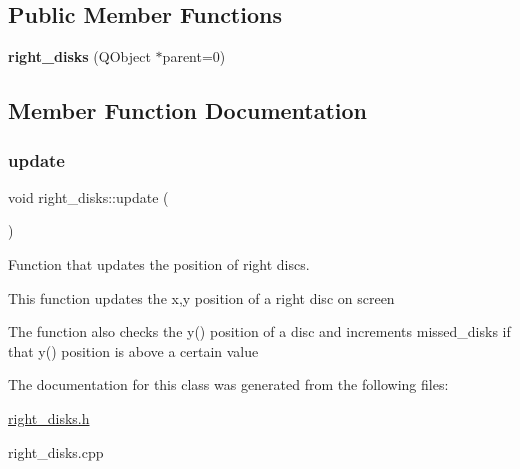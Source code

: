 \subsection*{Public Member Functions}
\begin{DoxyCompactItemize}
\item 
\mbox{\label{classright__disks_a88cf720f84861003d8a31f08344228bc}} 
{\bfseries right\+\_\+disks} (Q\+Object $\ast$parent=0)
\end{DoxyCompactItemize}


\subsection{Member Function Documentation}
\mbox{\label{classright__disks_a2dae29bf05aef3c3171d57f2aa7fa33f}} 
\subsubsection{\texorpdfstring{update}{update}}
{\footnotesize\ttfamily void right\+\_\+disks\+::update (\begin{DoxyParamCaption}{ }\end{DoxyParamCaption})\hspace{0.3cm}{\ttfamily [slot]}}



Function that updates the position of right discs. 

This function updates the x,y position of a right disc on screen

The function also checks the y() position of a disc and increments missed\+\_\+disks if that y() position is above a certain value 

The documentation for this class was generated from the following files\+:\begin{DoxyCompactItemize}
\item 
\hyperlink{right__disks_8h}{right\+\_\+disks.\+h}\item 
right\+\_\+disks.\+cpp\end{DoxyCompactItemize}
